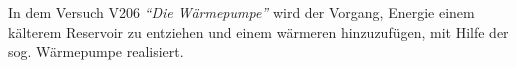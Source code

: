 In dem Versuch V206 \emph{\enquote{Die Wärmepumpe}} wird der Vorgang, Energie einem
kälterem Reservoir zu entziehen und einem wärmeren hinzuzufügen, mit Hilfe der sog. Wärmepumpe realisiert.